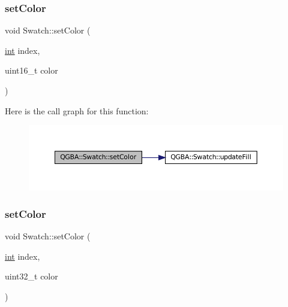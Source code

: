 \mbox{\label{class_q_g_b_a_1_1_swatch_a862505bc67be02d4c43418cfe67bedd4}} 
\subsubsection{\texorpdfstring{set\+Color}{setColor}\hspace{0.1cm}{\footnotesize\ttfamily [1/2]}}
{\footnotesize\ttfamily void Swatch\+::set\+Color (\begin{DoxyParamCaption}\item[{\mbox{\hyperlink{ioapi_8h_a787fa3cf048117ba7123753c1e74fcd6}{int}}}]{index,  }\item[{uint16\+\_\+t}]{color }\end{DoxyParamCaption})\hspace{0.3cm}{\ttfamily [slot]}}

Here is the call graph for this function\+:
\nopagebreak
\begin{figure}[H]
\begin{center}
\leavevmode
\includegraphics[width=350pt]{class_q_g_b_a_1_1_swatch_a862505bc67be02d4c43418cfe67bedd4_cgraph}
\end{center}
\end{figure}
\mbox{\label{class_q_g_b_a_1_1_swatch_a15aa3d0793ab2ba0b8fba0dda9ec039a}} 
\subsubsection{\texorpdfstring{set\+Color}{setColor}\hspace{0.1cm}{\footnotesize\ttfamily [2/2]}}
{\footnotesize\ttfamily void Swatch\+::set\+Color (\begin{DoxyParamCaption}\item[{\mbox{\hyperlink{ioapi_8h_a787fa3cf048117ba7123753c1e74fcd6}{int}}}]{index,  }\item[{uint32\+\_\+t}]{color }\end{DoxyParamCaption})\hspace{0.3cm}{\ttfamily [slot]}}

